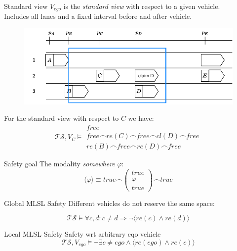 \documentclass[xcolor=table]{beamer}
\begin{document}
\begin{frame}{Standard view}
$V_{ego}$ is the \textit{standard view} with respect to a given vehicle.\\
\bigskip
Includes all lanes and a fixed interval before and after vehicle.
\pause
\begin{figure}[h]
	\centering
	\includegraphics[width=0.7 \textwidth]{../figs/MLSL_standard_view}
\end{figure}
\pause
For the standard view with respect to $C$ we have:
\begin{equation*}
\mathcal{TS}, V_{C} \models \begin{matrix}free \\
											free \frown re(C) \frown free \frown cl(D) \frown free \\
											re(B) \frown free \frown re(D) \frown free \end{matrix}
\end{equation*}
\end{frame}

\begin{frame}{Safety goal}
The modality \textit{somewhere} $\varphi$:
\begin{equation*}
\langle \varphi \rangle \equiv true \frown \begin{pmatrix}true \\ \varphi \\ true\end{pmatrix} \frown true
\end{equation*}
\pause
\begin{block}{Global MLSL Safety}
Different vehicles do not reserve the same space:

\begin{equation*}
\mathcal{TS} \models \forall c, d: c \ne d \Rightarrow \neg \langle re(c) \land re(d)\rangle
\end{equation*}
\end{block}
\pause

\begin{block}{Local MLSL Safety}
Safety wrt arbitrary eqo vehicle
\begin{equation*}\label{eq:safety_goal}
\mathcal{TS}, V_{ego} \models \neg \exists c \neq ego \land \langle re(ego) \land re(c)\rangle
\end{equation*}
\end{block}
\end{frame}
\end{document}
